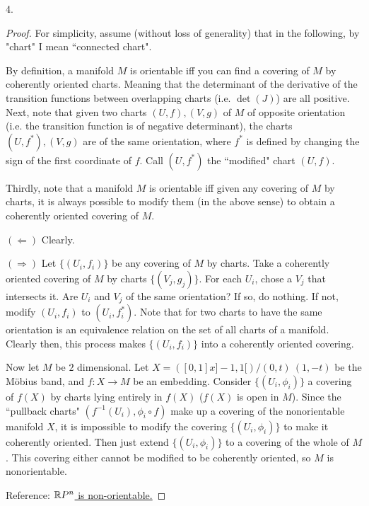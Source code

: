 4.
\begin{proof}
    For simplicity, assume (without loss of generality) that in the following, by "chart" I mean ``connected chart". 
    
    By definition, a manifold $M$ is orientable iff you can find a covering of $M$ by coherently oriented charts. Meaning that the determinant of the derivative of the transition functions between overlapping charts (i.e. $\det(J)$) are all positive. Next, note that given two charts $(U,f), (V,g)$ of $M$ of opposite orientation (i.e. the transition function is of negative determinant), the charts $(U,f^*),(V,g)$ are of the same orientation, where $f^*$ is defined by changing the sign of the first coordinate of $f$. Call $(U,f^*)$ the ``modified" chart $(U,f)$. 
    
    Thirdly, note that a manifold $M$ is orientable iff given any covering of $M$ by charts, it is always possible to modify them (in the above sense) to obtain a coherently oriented covering of $M$. 
    
    $(\Longleftarrow)$ Clearly.
    
    $(\Longrightarrow)$ Let $\{(U_i,f_i)\}$ be any covering of $M$ by charts. Take a coherently oriented covering of $M$ by charts $\{(V_j,g_j)\}$. For each $U_i$, chose a $ V_j $ that intersects it. Are $U_i$ and $V_j$ of the same orientation? If so, do nothing. If not, modify $(U_i,f_i)$ to $(U_i,f^*_i)$. Note that for two charts to have the same orientation is an equivalence relation on the set of all charts of a manifold. Clearly then, this process makes $\{(U_i,f_i)\}$ into a coherently oriented covering.  
    
    Now let $M$ be $2$ dimensional. Let $X=([0,1] x ]-1,1[)/(0,t)~(1,-t)$ be the M\"obius band, and $f:X\longrightarrow M$ be an embedding. Consider $\{(U_i,\phi_i)\}$ a covering of $f(X)$ by charts lying entirely in $f(X)$ ($f(X)$ is open in $M$). Since the ``pullback charts" $(f^{-1}(U_i), \phi_i \circ f)$ make up a covering of the nonorientable manifold $X$, it is impossible to modify the covering $\{(U_i,\phi_i)\}$ to make it coherently oriented. Then just extend $\{(U_i,\phi_i)\}$ to a covering of the whole of $M$. This covering either cannot be modified to be coherently oriented, so $M$ is nonorientable. %

Reference: \href{https://www.physicsforums.com/threads/how-to-understand-that-rp2-is-non-orientable.420456/}{${\mathbb R} P^n$ is non-orientable.}

\end{proof}
